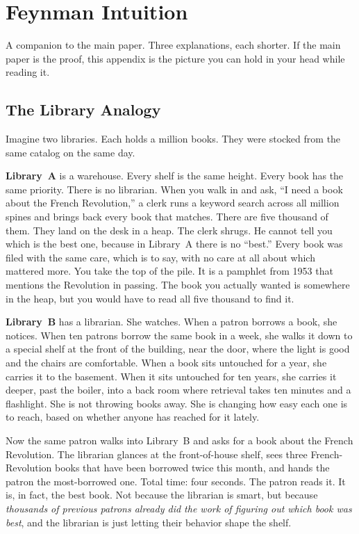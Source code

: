 \documentclass[11pt]{article}
\begin{document}
\section{Feynman Intuition}
\label{app:feynman}

A companion to the main paper.  Three explanations, each shorter.
If the main paper is the proof, this appendix is the picture you
can hold in your head while reading it.

\subsection{The Library Analogy}
\label{app:feynman-library}

Imagine two libraries.  Each holds a million books.  They were
stocked from the same catalog on the same day.

\textbf{Library~A} is a warehouse.  Every shelf is the same height.
Every book has the same priority.  There is no librarian.  When
you walk in and ask, ``I need a book about the French Revolution,''
a clerk runs a keyword search across all million spines and brings
back every book that matches.  There are five thousand of them.
They land on the desk in a heap.  The clerk shrugs.  He cannot
tell you which is the best one, because in Library~A there is no
``best.''  Every book was filed with the same care, which is to
say, with no care at all about which mattered more.  You take the
top of the pile.  It is a pamphlet from 1953 that mentions the
Revolution in passing.  The book you actually wanted is somewhere
in the heap, but you would have to read all five thousand to find
it.

\textbf{Library~B} has a librarian.  She watches.  When a patron
borrows a book, she notices.  When ten patrons borrow the same
book in a week, she walks it down to a special shelf at the front
of the building, near the door, where the light is good and the
chairs are comfortable.  When a book sits untouched for a year,
she carries it to the basement.  When it sits untouched for ten
years, she carries it deeper, past the boiler, into a back room
where retrieval takes ten minutes and a flashlight.  She is not
throwing books away.  She is changing how easy each one is to
reach, based on whether anyone has reached for it lately.

Now the same patron walks into Library~B and asks for a book about
the French Revolution.  The librarian glances at the front-of-house
shelf, sees three French-Revolution books that have been borrowed
twice this month, and hands the patron the most-borrowed one.
Total time: four seconds.  The patron reads it.  It is, in fact,
the best book.  Not because the librarian is smart, but because
\emph{thousands of previous patrons already did the work of figuring
out which book was best}, and the librarian is just letting their
behavior shape the shelf.
\end{document}
